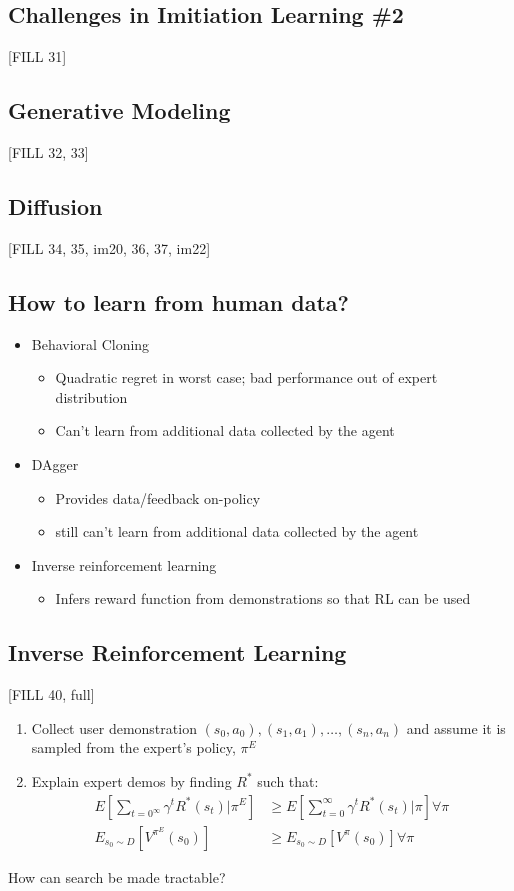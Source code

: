 \documentclass[10pt]{article}
\begin{document}
\subsection*{Challenges in Imitiation Learning \#2}
[FILL 31]

\subsection*{Generative Modeling}
[FILL 32, 33]

\subsection*{Diffusion}
[FILL 34, 35, im20, 36, 37, im22]

\subsection*{How to learn from human data?}
\begin{itemize}
	\item Behavioral Cloning
	\begin{itemize}
        \item Quadratic regret in worst case; bad performance out of expert distribution
        \item Can't learn from additional data collected by the agent
    \end{itemize}
	\item DAgger
	\begin{itemize}
        \item Provides data/feedback on-policy
        \item still can't learn from additional data collected by the agent
    \end{itemize}
    \item Inverse reinforcement learning
    \begin{itemize}
        \item Infers reward function from demonstrations so that RL can be used
    \end{itemize}
\end{itemize}

\subsection*{Inverse Reinforcement Learning}
[FILL 40, full]

\begin{enumerate}
    \item Collect user demonstration $(s_0, a_0), (s_1, a_1), \dots, (s_n, a_n)$ and assume it is sampled from the expert's policy, $\pi^E$
    \item Explain expert demos by finding $R^*$ such that:
    \begin{align*}
        E[\sum_{t = 0^\infty} \gamma^t R^* (s_t) | \pi^E] &\geq E[\sum_{t = 0}^\infty \gamma^t R^* (s_t) | \pi] \forall \pi\\
        E_{s_0 \sim D} [V^{\pi^E} (s_0)] &\geq E_{s_0 \sim D}[V^\pi (s_0)] \forall \pi
    \end{align*}
\end{enumerate}
How can search be made tractable?
\end{document}
